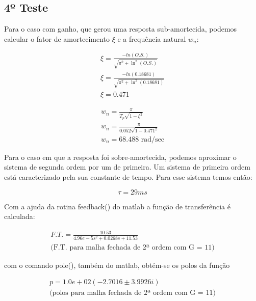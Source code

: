 \subsection{4º Teste}

Para o caso com ganho, que gerou uma resposta sub-amortecida, podemos calcular o fator de amortecimento $\xi$ e a frequência natural $w_n$:

\begin{equation}
\begin{array}{l}
    \xi = \frac{-ln(O.S.)}{\sqrt{\pi^2 + \ln^2(O.S.)}} \\
    \xi = \frac{-ln(0.18681)}{\sqrt{\pi^2 + \ln^2(0.18681)}} \\
    \boxed{\xi = 0.471}
\end{array}
\end{equation}

\begin{equation}
\begin{array}{l}
    w_n = \frac{\pi}{T_p \sqrt{1 - \xi^2}} \\
    w_n = \frac{\pi}{0.052 \sqrt{1 - 0.471^2}}\\
    \boxed{w_n = 68.488 \mbox{  rad/sec}}
\end{array}
\end{equation}

Para o caso em que a resposta foi sobre-amortecida, podemos aproximar o sistema de segunda ordem por um de primeira. Um sistema de primeira ordem está caracterizado pela sua constante de tempo. Para esse sistema temos então:

\begin{equation}
    \boxed{\tau = 29 ms}
\end{equation}

Com a ajuda da rotina feedback() do matlab a função de transferência é calculada:

\begin{equation}
\begin{array}{l}
    \boxed{F.T.
    = \frac{10.53}{4.96e-5 s^2 + 0.0268 s + 11.53}} \\
    \mbox{(F.T. para malha fechada de 2ª ordem com G = 11)}
\end{array}
\end{equation}

com o comando pole(), também do matlab, obtém-se os polos da função

\begin{equation}
\begin{array}{l}
    \boxed{p = 1.0e+02( -2.7016 \pm 3.9926i)
} \\
    \mbox{(polos para malha fechada de 2ª ordem com G = 11)}
\end{array}
\end{equation}

